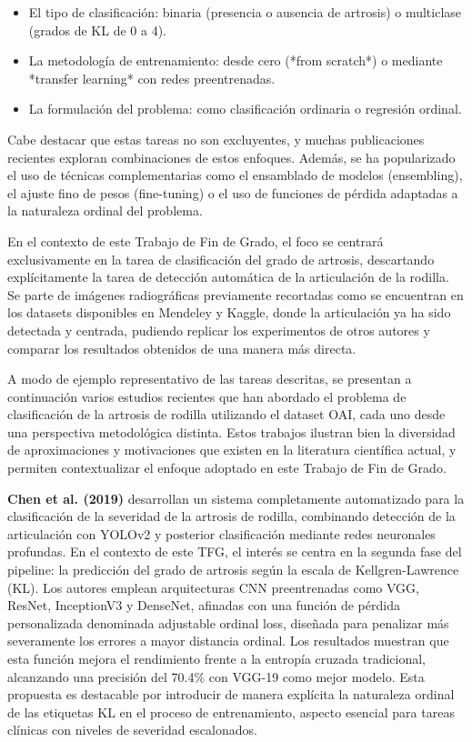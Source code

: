 \documentclass[11pt,spanish,listoffigures,listoftables]{tfgetsinf}
\begin{document}
\begin{itemize}
    \item El tipo de clasificación: binaria (presencia o ausencia de artrosis) o multiclase (grados de KL de 0 a 4).
    \item La metodología de entrenamiento: desde cero (*from scratch*) o mediante *transfer learning* con redes preentrenadas.
    \item La formulación del problema: como clasificación ordinaria o regresión ordinal.
\end{itemize}

Cabe destacar que estas tareas no son excluyentes, y muchas publicaciones recientes exploran combinaciones de estos enfoques. Además, se ha popularizado el uso de técnicas complementarias 
como el ensamblado de modelos (ensembling), el ajuste fino de pesos (fine-tuning) o el uso de funciones de pérdida adaptadas a la naturaleza ordinal del problema.

En el contexto de este Trabajo de Fin de Grado, el foco se centrará exclusivamente en la tarea de clasificación del grado de artrosis, descartando explícitamente la tarea de detección automática de 
la articulación de la rodilla. Se parte de imágenes radiográficas previamente recortadas como se encuentran en los datasets disponibles en Mendeley y Kaggle, donde la articulación ya ha sido
detectada y centrada, pudiendo replicar los experimentos de otros autores y comparar los resultados obtenidos de una manera más directa. 

A modo de ejemplo representativo de las tareas descritas, se presentan a continuación varios estudios recientes que han abordado el problema de clasificación de la artrosis de 
rodilla utilizando el dataset OAI, cada uno desde una perspectiva metodológica distinta. Estos trabajos ilustran bien la diversidad de aproximaciones y motivaciones que existen 
en la literatura científica actual, y permiten contextualizar el enfoque adoptado en este Trabajo de Fin de Grado.

\textbf{Chen et al. (2019)} \cite{chen2019fully} desarrollan un sistema completamente automatizado para la clasificación de la severidad de la 
artrosis de rodilla, combinando detección de la articulación con YOLOv2 y posterior clasificación mediante redes neuronales profundas. 
En el contexto de este TFG, el interés se centra en la segunda fase del pipeline: la predicción del grado de artrosis según la escala de 
Kellgren-Lawrence (KL). Los autores emplean arquitecturas CNN preentrenadas como VGG, ResNet, InceptionV3 y DenseNet, afinadas con una función de 
pérdida personalizada denominada adjustable ordinal loss, diseñada para penalizar más severamente los errores a mayor distancia ordinal. 
Los resultados muestran que esta función mejora el rendimiento frente a la entropía cruzada tradicional, alcanzando una precisión del 70.4\% con 
VGG-19 como mejor modelo. Esta propuesta es destacable por introducir de manera explícita la naturaleza ordinal de las etiquetas KL en el proceso 
de entrenamiento, aspecto esencial para tareas clínicas con niveles de severidad escalonados.
\end{document}
